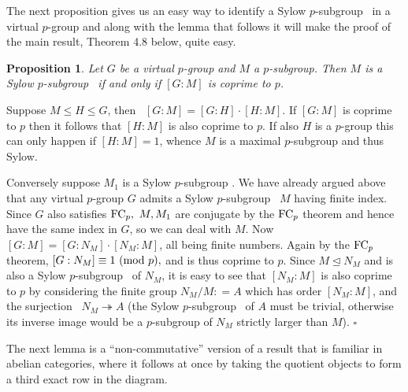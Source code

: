 \documentclass[11pt]{article}
\theoremstyle{change}
\newtheorem{Pro}[Thm]{Proposition}
\newcommand{\<}{\langle}
\renewcommand{\>}{\rangle}
\newcommand{\qed}{\quad\hfill$\square$}
\newcommand{\syl}{Sylow $p$-subgroup }
\begin{document}
The next proposition gives us an easy way to identify a \syl \ in a virtual $p$-group and along with the lemma that follows it  will make the proof
of the main result,  Theorem 4.8 below, quite easy.

\begin{Pro} Let $G$ be a virtual $p$-group and $M$ a $p$-subgroup. Then $M$ is a \syl \ if and only if
$[G:M]$ is coprime to $p$.
\end{Pro}
\begin{Proof} Suppose $M \leq H \leq G$, then \ $[G:M] = [G:H]\cdot [H:M]$. If $[G:M]$ is coprime to $p$
then it follows that $[H:M]$ is also coprime to $p$. If also $H$ is a $p$-group this can only
happen if $[H:M] = 1$, whence $M$ is a maximal $p$-subgroup and thus Sylow. 

Conversely suppose
$M_1$ is a \syl. We have already argued above that any virtual $p$-group $G$ admits a \syl \ $M$
having finite index. Since $G$ also satisfies ${\rm FC}_p, \ M, M_1$ are conjugate by the
${\rm FC}_p$ theorem and hence have the same
index in $G$, so we can deal with $M$. Now \ $[G:M] = [G:N_M] \cdot [N_M:M]$, all being finite numbers. Again by the ${\rm FC}_p$ theorem, $[G:N_M] \equiv 1 \ 
({\rm mod} \ p), $ and is thus coprime to $p$. Since $M \trianglelefteq N_M$ and is also a \syl \ of $N_M$, it is easy to see that $[N_M:M]$ is also coprime
to $p$ by considering the finite group $N_M/M : = A$  which has order $[N_M:M]$, and the surjection
\ $ N_M \twoheadrightarrow A$ (the \syl \ of $A$ must be trivial, otherwise
its inverse image would be a $p$-subgroup of $N_M$ strictly larger than $M$).
\qed           
\end{Proof}

The next lemma is a ``non-commutative'' version of a result that is 
familiar in abelian categories, where it follows at once by
taking the quotient objects to form a third exact row in the diagram.
\end{document}
